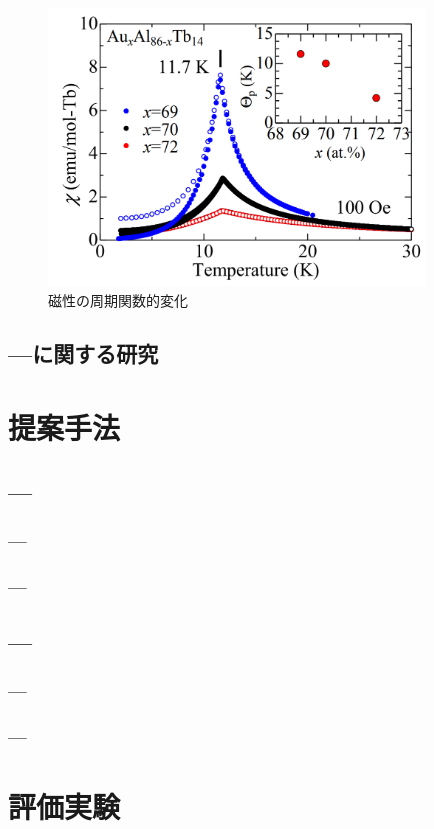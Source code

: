 \documentclass[11pt,a4j]{jreport}
\begin{document}
\begin{figure}[htbp]
  \centering
  \vspace{10mm}
  \includegraphics[width=100mm]{./figure/qi.png}
  \caption{磁性の周期関数的変化}
  \label{χ}
\end{figure}

\section{---に関する研究}

\chapter{提案手法}
\section{---}
\subsection{---}
\subsection{---}
\section{---}
\subsection{---}
\subsection{---}

\chapter{評価実験}
\end{document}
